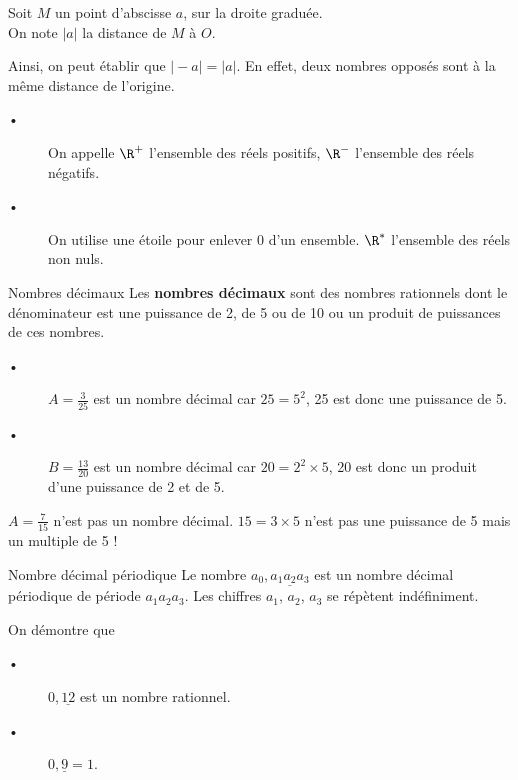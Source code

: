


\begin{Nt}
Soit $M$ un point d'abscisse $a$, sur la droite graduée.\\
On note $\vert a\vert$ la distance de $M$ à $O$.

Ainsi, on peut établir que $\vert -a \vert = \vert a \vert$. En effet, deux nombres opposés sont à la même distance de l'origine.
\end{Nt}






\begin{Nt}
\begin{description}
\item[•] On appelle $\R^+$ l'ensemble des réels positifs, $\R^-$ l'ensemble des réels négatifs.
\item[•] On utilise une étoile pour enlever 0 d'un ensemble. $\R^*$ l'ensemble des réels non nuls.
\end{description}
\end{Nt}





\begin{DefT}{Nombres décimaux}
Les \textbf{nombres décimaux} sont des nombres rationnels dont le dénominateur est une puissance de 2, de 5 ou de 10 ou un produit de puissances de ces nombres.
\end{DefT}

\begin{Ex}
\begin{description}
\item[•] $A=\frac{3}{25}$ est un nombre décimal car $25 = 5^2$, 25 est donc une puissance de 5.
\item[•] $B=\frac{13}{20}$ est un nombre décimal car $20 = 2^2 \times 5$, 20 est donc un produit d'une puissance de 2 et de 5.
\end{description}
\end{Ex}

\begin{Att}
$A=\frac{7}{15}$ n'est pas un nombre décimal. $15=3 \times 5$ n'est pas une puissance de 5 mais un multiple de 5 !
\end{Att}



\begin{DefT}{Nombre décimal périodique}
Le nombre $a_0,\underline{a_1a_2a_3}$ est un nombre décimal périodique de période $a_1a_2a_3$. Les chiffres $a_1$, $a_2$, $a_3$ se répètent indéfiniment.
\end{DefT}
\begin{Dem}

On démontre que 
\begin{description}
\item[•] $0,\underline{12}$ est un nombre rationnel.
\item[•] $0,\underline{9}=1$.
\end{description}
\end{Dem}

